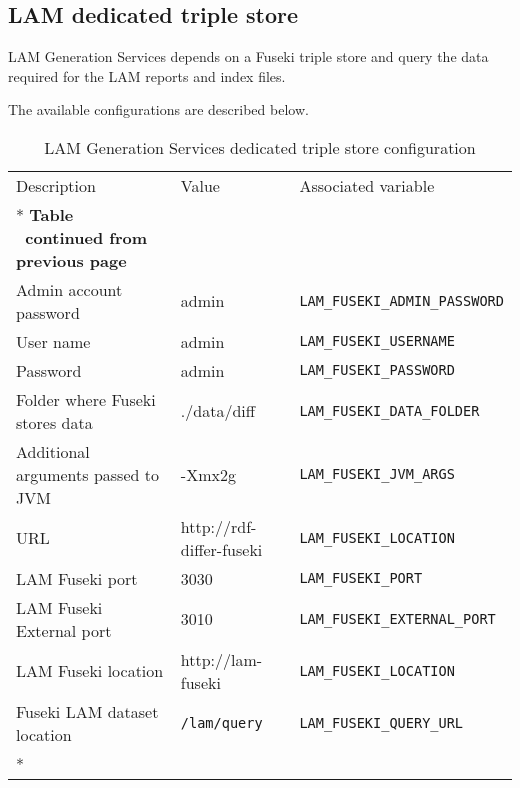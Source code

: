 \subsection{LAM dedicated triple store}
	
LAM Generation Services depends on a Fuseki triple store and query the data required for the LAM reports and index files.

The available configurations are described below. 

\begin{longtable}[c]{@{}p{4cm}p{5cm}l@{}}
	\toprule
	Description & Value & Associated variable \\* \midrule
	\endfirsthead
	\multicolumn{3}{c}%
	{{\bfseries Table \thetable\ continued from previous page}} \\
	\endhead
	\bottomrule
	\endfoot
	\endlastfoot
	Admin account password & admin & \texttt{LAM\_FUSEKI\_ADMIN\_PASSWORD} \\
	User name & admin & \texttt{LAM\_FUSEKI\_USERNAME} \\
	Password & admin & \texttt{LAM\_FUSEKI\_PASSWORD} \\
	Folder where Fuseki stores data & ./data/diff & \texttt{LAM\_FUSEKI\_DATA\_FOLDER} \\
	Additional arguments passed to JVM & -Xmx2g & \texttt{LAM\_FUSEKI\_JVM\_ARGS} \\
	URL & http://rdf-differ-fuseki & \texttt{LAM\_FUSEKI\_LOCATION} \\
	LAM Fuseki port                     & 3030                              & \texttt{LAM\_FUSEKI\_PORT}             \\
	LAM Fuseki External port            & 3010                              & \texttt{LAM\_FUSEKI\_EXTERNAL\_PORT}   \\
	LAM Fuseki location                 & http://lam-fuseki                 & \texttt{LAM\_FUSEKI\_LOCATION}     \\
	Fuseki LAM dataset location                  & \texttt{/lam/query}
	& \texttt{LAM\_FUSEKI\_QUERY\_URL}     \\* \bottomrule
	\caption{LAM Generation Services dedicated triple store configuration}
	\label{tab:fuseki}\\
\end{longtable}